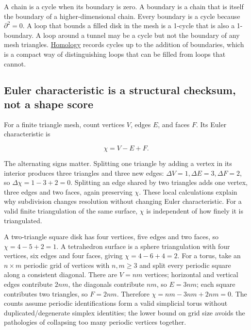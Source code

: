 A chain is a cycle when its boundary is zero. A boundary is a chain that is itself the boundary of a higher-dimensional chain. Every boundary is a cycle because \(\partial^2=0\). A loop that bounds a filled disk in the mesh is a 1-cycle that is also a 1-boundary. A loop around a tunnel may be a cycle but not the boundary of any mesh triangles. \hyperref[appendix-e38976cbbf86]{Homology} records cycles up to the addition of boundaries, which is a compact way of distinguishing loops that can be filled from loops that cannot.


\subsection{Euler characteristic is a structural checksum, not a shape score}\label{03-visual-computing-i-ch002-euler-characteristic-is-a-structural-checksum-not-a-shape-score}

\hypertarget{03-visual-computing-i-ch002-euler-characteristic-is-a-structural-checksum-not-a-shape-score}{}

For a finite triangle mesh, count vertices \(V\), edges \(E\), and faces \(F\). Its Euler characteristic is

\[
\chi=V-E+F.
\]

The alternating signs matter. Splitting one triangle by adding a vertex in its interior produces three triangles and three new edges: \(\Delta V=1,\Delta E=3,\Delta F=2\), so \(\Delta\chi=1-3+2=0\). Splitting an edge shared by two triangles adds one vertex, three edges and two faces, again preserving \(\chi\). These local calculations explain why subdivision changes resolution without changing Euler characteristic. For a valid finite triangulation of the same surface, \(\chi\) is independent of how finely it is triangulated.

A two-triangle square disk has four vertices, five edges and two faces, so \(\chi=4-5+2=1\). A tetrahedron surface is a sphere triangulation with four vertices, six edges and four faces, giving \(\chi=4-6+4=2\). For a torus, take an \(n\times m\) periodic grid of vertices with \(n,m\ge3\) and split every periodic square along a consistent diagonal. There are \(V=nm\) vertices; horizontal and vertical edges contribute \(2nm\), the diagonals contribute \(nm\), so \(E=3nm\); each square contributes two triangles, so \(F=2nm\). Therefore \(\chi=nm-3nm+2nm=0\). The counts assume periodic identifications form a valid simplicial torus without duplicated/degenerate simplex identities; the lower bound on grid size avoids the pathologies of collapsing too many periodic vertices together.

